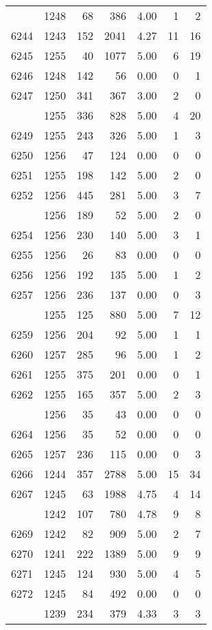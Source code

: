 \documentclass[
]{article}
\begin{document}
\begin{table}
\begin{tabular}[t]{lrrrrrr}
\addlinespace
6243 & 1248 & 68 & 386 & 4.00 & 1 & 2\\
6244 & 1243 & 152 & 2041 & 4.27 & 11 & 16\\
6245 & 1255 & 40 & 1077 & 5.00 & 6 & 19\\
6246 & 1248 & 142 & 56 & 0.00 & 0 & 1\\
6247 & 1250 & 341 & 367 & 3.00 & 2 & 0\\
\addlinespace
6248 & 1255 & 336 & 828 & 5.00 & 4 & 20\\
6249 & 1255 & 243 & 326 & 5.00 & 1 & 3\\
6250 & 1256 & 47 & 124 & 0.00 & 0 & 0\\
6251 & 1255 & 198 & 142 & 5.00 & 2 & 0\\
6252 & 1256 & 445 & 281 & 5.00 & 3 & 7\\
\addlinespace
6253 & 1256 & 189 & 52 & 5.00 & 2 & 0\\
6254 & 1256 & 230 & 140 & 5.00 & 3 & 1\\
6255 & 1256 & 26 & 83 & 0.00 & 0 & 0\\
6256 & 1256 & 192 & 135 & 5.00 & 1 & 2\\
6257 & 1256 & 236 & 137 & 0.00 & 0 & 3\\
\addlinespace
6258 & 1255 & 125 & 880 & 5.00 & 7 & 12\\
6259 & 1256 & 204 & 92 & 5.00 & 1 & 1\\
6260 & 1257 & 285 & 96 & 5.00 & 1 & 2\\
6261 & 1255 & 375 & 201 & 0.00 & 0 & 1\\
6262 & 1255 & 165 & 357 & 5.00 & 2 & 3\\
\addlinespace
6263 & 1256 & 35 & 43 & 0.00 & 0 & 0\\
6264 & 1256 & 35 & 52 & 0.00 & 0 & 0\\
6265 & 1257 & 236 & 115 & 0.00 & 0 & 3\\
6266 & 1244 & 357 & 2788 & 5.00 & 15 & 34\\
6267 & 1245 & 63 & 1988 & 4.75 & 4 & 14\\
\addlinespace
6268 & 1242 & 107 & 780 & 4.78 & 9 & 8\\
6269 & 1242 & 82 & 909 & 5.00 & 2 & 7\\
6270 & 1241 & 222 & 1389 & 5.00 & 9 & 9\\
6271 & 1245 & 124 & 930 & 5.00 & 4 & 5\\
6272 & 1245 & 84 & 492 & 0.00 & 0 & 0\\
\addlinespace
6273 & 1239 & 234 & 379 & 4.33 & 3 & 3\\

\end{tabular}
\end{table}
\end{document}
